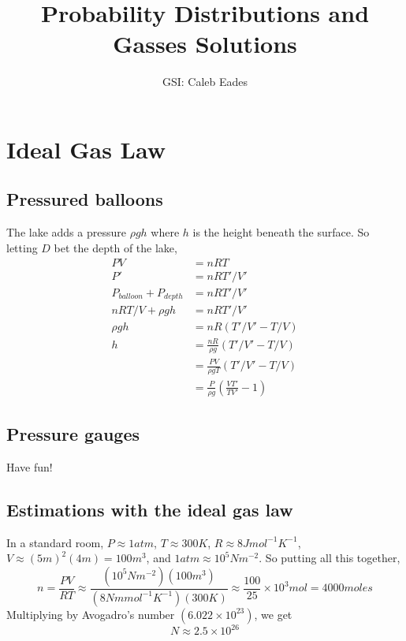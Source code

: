 \documentclass{article}
\begin{document}
	
\title{Probability Distributions and Gasses Solutions}
\author{GSI: Caleb Eades}
\maketitle

\section{Ideal Gas Law}

\subsection{Pressured balloons}

The lake adds a pressure $\rho gh$ where $h$ is the height beneath the surface. So letting $D$ bet the depth of the lake,
\begin{align*}
PV &= nRT \\
P' &= nRT'/V' \\
P_{balloon} + P_{depth} &= nRT'/V' \\
nRT/V + \rho gh &= nRT'/V' \\
\rho gh &= nR(T'/V'-T/V) \\
h &= \frac{nR}{\rho g}(T'/V'-T/V) \\
&= \frac{PV}{\rho gT}(T'/V'-T/V) \\
&= \frac{P}{\rho g}\left(\frac{VT'}{TV'}-1\right)
\end{align*}

\subsection{Pressure gauges}

Have fun!

\subsection{Estimations with the ideal gas law}

In a standard room, $P\approx 1 atm$, $T \approx 300 K$, $R\approx 8 J mol^{-1} K^{-1}$, $V\approx (5 m)^2(4 m) = 100 m^3$, and $1 atm\approx 10^5 N m^{-2}$. So putting all this together,
\begin{equation}
n = \frac{PV}{RT} \approx \frac{(10^5 N m^{-2})(100 m^3)}{(8 N m mol^{-1} K^{-1})(300 K)} \approx \frac{100}{25}\times 10^3 mol = 4000 moles
\end{equation}
Multiplying by Avogadro's number $\left(6.022\times10^{23}\right)$, we get
\begin{equation}
N\approx 2.5\times10^{26}
\end{equation}
\end{document}
